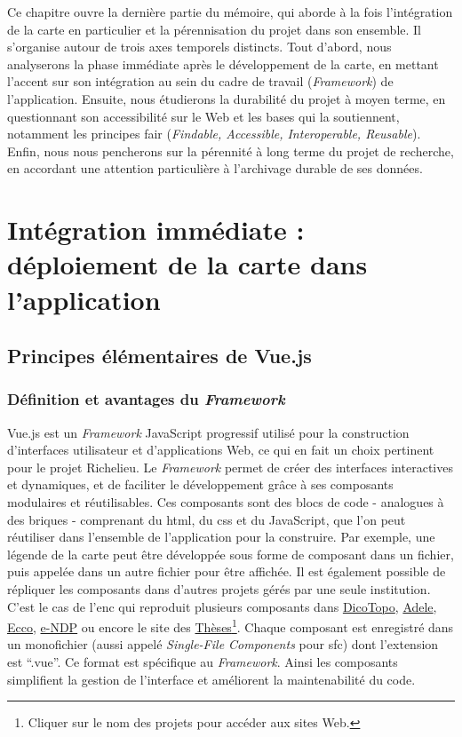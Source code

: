 Ce chapitre ouvre la dernière partie du mémoire, qui aborde à la fois l'intégration de la carte en particulier et la pérennisation du projet dans son ensemble. Il s'organise autour de trois axes temporels distincts. Tout d'abord, nous analyserons la phase immédiate après le développement de la carte, en mettant l'accent sur son intégration au sein du cadre de travail (\textit{Framework}) de l'application. Ensuite, nous étudierons la durabilité du projet à moyen terme, en questionnant son accessibilité sur le Web et les bases qui la soutiennent, notamment les principes  \acrshort{fair} (\textit{Findable, Accessible, Interoperable, Reusable}). Enfin, nous nous pencherons sur la pérennité à long terme du projet de recherche, en accordant une attention particulière à l'archivage durable de ses données. 

\section{Intégration immédiate : déploiement de la carte dans l'application}

\subsection{Principes élémentaires de Vue.js}
\subsubsection{Définition et avantages du \textit{Framework}}

Vue.js est un \textit{Framework} JavaScript progressif utilisé pour la construction d'interfaces utilisateur et d'applications Web, ce qui en fait un choix pertinent pour le projet Richelieu. Le \textit{Framework} permet de créer des interfaces interactives et dynamiques, et de faciliter le développement grâce à ses composants modulaires et réutilisables. Ces composants sont des blocs de code - analogues à des briques - comprenant du  \acrshort{html}, du  \acrshort{css} et du JavaScript, que l'on peut réutiliser dans l'ensemble de l'application pour la construire. Par exemple, une légende de la carte peut être développée sous forme de composant dans un fichier, puis appelée dans un autre fichier pour être affichée. Il est également possible de répliquer les composants dans d'autres projets gérés par une seule institution. C'est le cas de l'\acrshort{enc} qui reproduit plusieurs composants dans \href{https://dicotopo.cths.fr/}{DicoTopo}, \href{ https://adele.chartes.psl.eu/}{Adele}, \href{https://dev.chartes.psl.eu/ecco/}{Ecco}, \href{https://endp.chartes.psl.eu/}{e-NDP} ou encore le site des \href{https://theses.chartes.psl.eu/}{Thèses}\footnote{Cliquer sur le nom des projets pour accéder aux sites Web.}. Chaque composant est enregistré dans un monofichier (aussi appelé \textit{Single-File Components} pour \acrshort{sfc}) dont l'extension est \enquote{.vue}. Ce format est spécifique au \textit{Framework}. Ainsi les composants simplifient la gestion de l'interface et améliorent la maintenabilité du code.

